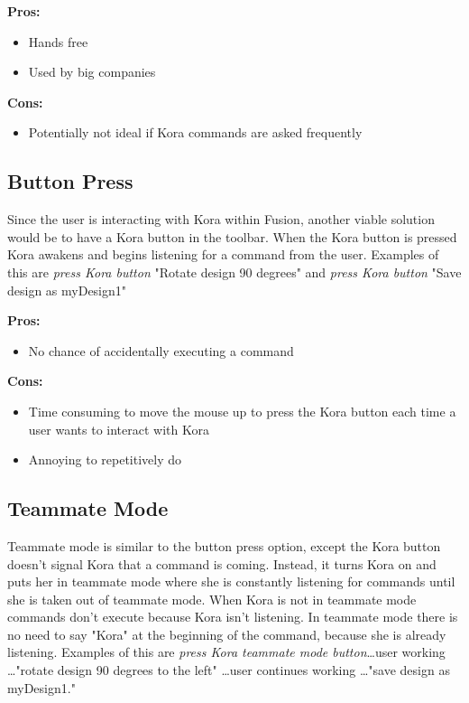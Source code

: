 \documentclass[onecolumn, draftclsnofoot,10pt, compsoc]{IEEEtran}
\begin{document}
			\textbf{Pros:}
				\begin{itemize}
					\item{
						Hands free}
					\item{
						Used by big companies}
				\end{itemize}
				
			\textbf{Cons:}
				\begin{itemize}
					\item{
						Potentially not ideal if Kora commands are asked frequently}
				\end{itemize}
			
			
		\subsection{Button Press}
			Since the user is interacting with Kora within Fusion, another viable solution would be to have a Kora button in the toolbar.
			When the Kora button is pressed Kora awakens and begins listening for a command from the user.
			Examples of this are \textit{press Kora button} "Rotate design 90 degrees" and  \textit{press Kora button} "Save design as myDesign1"
			
			\textbf{Pros:}
				\begin{itemize}
					\item{
						No chance of accidentally executing a command}
				\end{itemize}
			
			\textbf{Cons:}
				\begin{itemize}
					\item{
						Time consuming to move the mouse up to press the Kora button each time a user wants to interact with Kora}
					\item{
						Annoying to repetitively do}
				\end{itemize}
			
			
		\subsection{Teammate Mode}
			Teammate mode is similar to the button press option, except the Kora button doesn't signal Kora that a command is coming. 
			Instead, it turns Kora on and puts her in teammate mode where she is constantly listening for commands until she is taken out of teammate mode.
			When Kora is not in teammate mode commands don't execute because Kora isn't listening.
			In teammate mode there is no need to say "Kora" at the beginning of the command, because she is already listening.
			Examples of this are \textit{press Kora teammate mode button}\dots user working \dots "rotate design 90 degrees to the left" \dots user continues working \dots"save design as myDesign1."
			
\end{document}
